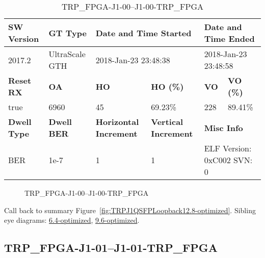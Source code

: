 \begin{table}[h]
\centering
\caption{TRP\_FPGA-J1-00--J1-00-TRP\_FPGA}
\label{tab:TRPFPGAJ100J100TRPFPGA12.8-optimized}
\begin{tabular}{@{}|l|l|l|l|l|l|@{}}
\toprule
\textbf{SW Version}                & \textbf{GT Type}   & \multicolumn{2}{l|}{\textbf{Date and Time Started}}            & \multicolumn{2}{l|}{\textbf{Date and Time Ended}}        \\ \midrule
2017.2                       & UltraScale GTH          & \multicolumn{2}{l|}{2018-Jan-23 23:48:38}                   & \multicolumn{2}{l|}{2018-Jan-23 23:48:58}               \\ \midrule
\textbf{Reset RX}                  & \textbf{OA} & \textbf{HO}   & \textbf{HO (\%)} & \textbf{VO} & \textbf{VO (\%)} \\ \midrule
true & 6960        & 45          & 69.23\%        & 228        & 89.41\%       \\ \midrule
\textbf{Dwell Type}                & \textbf{Dwell BER} & \textbf{Horizontal Increment} & \textbf{Vertical Increment}    & \multicolumn{2}{l|}{\textbf{Misc Info}}                  \\ \midrule
BER                            & 1e-7        & 1        & 1           & \multicolumn{2}{l|}{ELF Version: 0xC002 SVN: 0}                         \\ \bottomrule
\end{tabular}
\end{table}

\begin{figure}[h]
\caption{TRP\_FPGA-J1-00--J1-00-TRP\_FPGA} \label{fig:TRPFPGAJ100J100TRPFPGA12.8-optimized}
\end{figure}

Call back to summary Figure~\ref{fig:TRPJ1QSFPLoopback12.8-optimized}.
Sibling eye diagrams: \hyperref[sec:TRPFPGAJ100J100TRPFPGA6.4-optimized]{6.4-optimized}, \hyperref[sec:TRPFPGAJ100J100TRPFPGA9.6-optimized]{9.6-optimized}.

\clearpage
\newpage


\subsection{TRP\_FPGA-J1-01--J1-01-TRP\_FPGA}\label{sec:TRPFPGAJ101J101TRPFPGA12.8-optimized}

